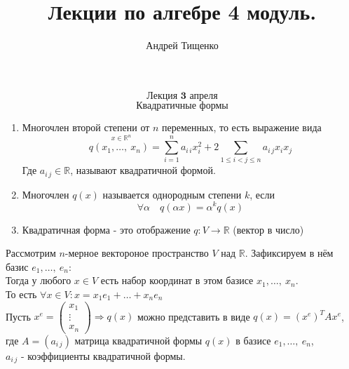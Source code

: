 \documentclass[12pt, letterpaper, twoside]{article}
\title{Лекции по алгебре 4 модуль.}
\author{Андрей Тищенко}
\date{}
\begin{document}
    \maketitle
    \[\textbf{Лекция 3 апреля}\]
    \[\text{Квадратичные формы}\]
    \begin{enumerate}
        \item[\text{Определение:}] Многочлен второй степени от $n$ переменных, то есть выражение вида
        \[q\overset{x\in \mathbb{R}^n}{(x_1,\dots,\ x_n)} = \sum_{i = 1}^{n} a_{i\, i}x_i^2 + 2\sum_{1\leq i < j \leq n} a_{i\, j}x_{i}x_{j}\]
        Где $a_{i\, j}\in \mathbb{R}$, называют квадратичной формой.
        \item[\text{Замечание:}] Многочлен $q(x)$ называется однородным степени $k$, если
        \[\forall \alpha\quad q(\alpha x) = \alpha^k q(x)\]
        \item[\text{Замечание:}] Квадратичная форма - это отображение $q: V\longrightarrow \mathbb{R}$ (вектор в число)
    \end{enumerate}
    Рассмотрим $n$-мерное вектороное пространство $V$ над $\mathbb{R}$. Зафиксируем в нём базис $e_1,\dots,\ e_n$:\\
    Тогда у любого $x\in V$ есть набор координат в этом базисе $x_1,\dots,\ x_n$.\\
    То есть $\forall x\in V: x=x_1e_1+\dots+x_{n} e_{n}$\\
    Пусть $x^e = \begin{pmatrix}
        x_1\\
        \vdots\\
        x_n
    \end{pmatrix}\Rightarrow q(x)$ можно представить в виде $q(x) = (x^e)^{T}A x^{e}$, где $A = (a_{i\, j})$ матрица квадратичной формы $q(x)$ в базисе $e_1,\dots,\ e_n$,\\
    $a_{i\, j}$ - коэффициенты квадратичной формы.
\end{document}
